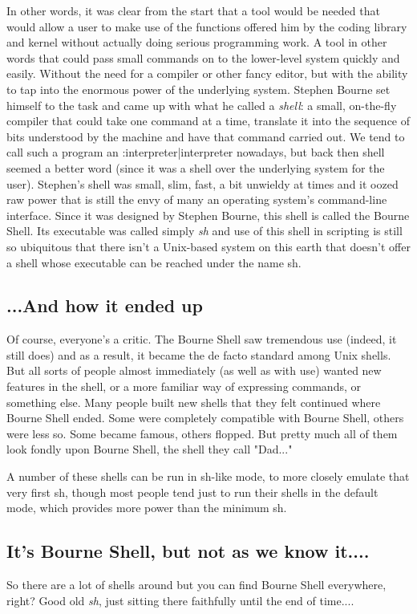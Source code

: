 In other words, it was clear from the start that a tool would be needed that
would allow a user to make use of the functions offered him by the coding
library and kernel without actually doing serious programming work. A tool in
other words that could pass small commands on to the lower-level system quickly
and easily. Without the need for a compiler or other fancy editor, but with the
ability to tap into the enormous power of the underlying system. Stephen Bourne
set himself to the task and came up with what he called a \textit{shell}: a
small, on-the-fly compiler that could take one command at a time, translate it
into the sequence of bits understood by the machine and have that command
carried out. We tend to call such a program an :interpreter|interpreter
nowadays, but back then shell seemed a better word (since it was a shell over
the underlying system for the user). Stephen's shell was small, slim, fast, a
bit unwieldy at times and it oozed raw power that is still the envy of many an
operating system's command-line interface. Since it was designed by Stephen
Bourne, this shell is called the Bourne Shell. Its executable was called simply
\textit{sh} and use of this shell in scripting is still so ubiquitous that
there isn't a Unix-based system on this earth that doesn't offer a shell whose
executable can be reached under the name sh.

\subsection{...And how it ended up}
Of course, everyone's a critic. The Bourne Shell saw tremendous use (indeed, it
still does) and as a result, it became the de facto standard among Unix shells.
But all sorts of people almost immediately (as well as with use) wanted new
features in the shell, or a more familiar way of expressing commands, or
something else. Many people built new shells that they felt continued where
Bourne Shell ended. Some were completely compatible with Bourne Shell, others
were less so. Some became famous, others flopped. But pretty much all of them
look fondly upon Bourne Shell, the shell they call "Dad..."

A number of these shells can be run in sh-like mode, to more closely emulate
that very first sh, though most people tend just to run their shells in the
default mode, which provides more power than the minimum sh.

\subsection{It's Bourne Shell, but not as we know it....}
So there are a lot of shells around but you can find Bourne Shell everywhere,
right? Good old \textit{sh}, just sitting there faithfully until the end of
time....

